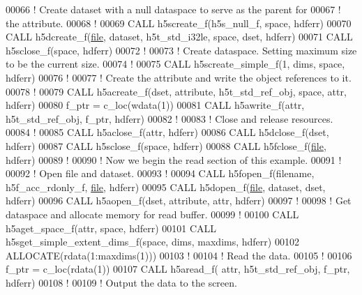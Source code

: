 \begin{DoxyCode}
00066   \textcolor{comment}{! Create dataset with a null dataspace to serve as the parent for}
00067   \textcolor{comment}{! the attribute.}
00068   \textcolor{comment}{!}
00069   \textcolor{keyword}{CALL }h5screate\_f(h5s\_null\_f, space, hdferr)
00070   \textcolor{keyword}{CALL }h5dcreate\_f(\hyperlink{structfile}{file}, dataset, h5t\_std\_i32le, space, dset, hdferr)
00071   \textcolor{keyword}{CALL }h5sclose\_f(space, hdferr)
00072   \textcolor{comment}{!}
00073   \textcolor{comment}{! Create dataspace.  Setting maximum size to be the current size.}
00074   \textcolor{comment}{!}
00075   \textcolor{keyword}{CALL }h5screate\_simple\_f(1, dims, space, hdferr)
00076   \textcolor{comment}{!}
00077   \textcolor{comment}{! Create the attribute and write the object references to it.}
00078   \textcolor{comment}{!}
00079   \textcolor{keyword}{CALL }h5acreate\_f(dset, attribute, h5t\_std\_ref\_obj, space, attr, hdferr)
00080   f\_ptr = c\_loc(wdata(1))
00081   \textcolor{keyword}{CALL }h5awrite\_f(attr, h5t\_std\_ref\_obj, f\_ptr, hdferr)
00082   \textcolor{comment}{!}
00083   \textcolor{comment}{! Close and release resources.}
00084   \textcolor{comment}{!}
00085   \textcolor{keyword}{CALL }h5aclose\_f(attr, hdferr)
00086   \textcolor{keyword}{CALL }h5dclose\_f(dset, hdferr)
00087   \textcolor{keyword}{CALL }h5sclose\_f(space, hdferr)
00088   \textcolor{keyword}{CALL }h5fclose\_f(\hyperlink{structfile}{file}, hdferr)
00089   \textcolor{comment}{!}
00090   \textcolor{comment}{! Now we begin the read section of this example.}
00091   \textcolor{comment}{!}
00092   \textcolor{comment}{! Open file and dataset.}
00093   \textcolor{comment}{!}
00094   \textcolor{keyword}{CALL }h5fopen\_f(filename, h5f\_acc\_rdonly\_f, \hyperlink{structfile}{file}, hdferr)
00095   \textcolor{keyword}{CALL }h5dopen\_f(\hyperlink{structfile}{file}, dataset, dset, hdferr)
00096   \textcolor{keyword}{CALL }h5aopen\_f(dset, attribute, attr, hdferr)
00097   \textcolor{comment}{!}
00098   \textcolor{comment}{! Get dataspace and allocate memory for read buffer.}
00099   \textcolor{comment}{!}
00100   \textcolor{keyword}{CALL }h5aget\_space\_f(attr, space, hdferr)
00101   \textcolor{keyword}{CALL }h5sget\_simple\_extent\_dims\_f(space, dims, maxdims, hdferr)
00102   \textcolor{keyword}{ALLOCATE}(rdata(1:maxdims(1)))
00103   \textcolor{comment}{!}
00104   \textcolor{comment}{! Read the data.}
00105   \textcolor{comment}{!}
00106   f\_ptr = c\_loc(rdata(1))
00107   \textcolor{keyword}{CALL }h5aread\_f( attr, h5t\_std\_ref\_obj, f\_ptr, hdferr)
00108   \textcolor{comment}{!}
00109   \textcolor{comment}{! Output the data to the screen.}

\end{DoxyCode}
